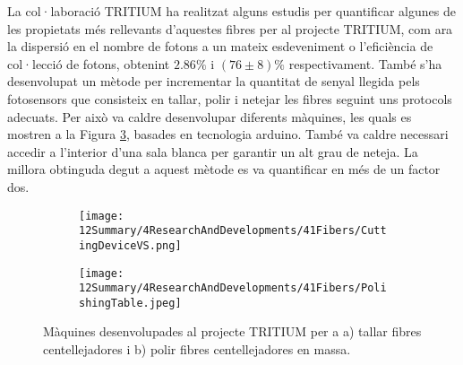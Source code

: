 La col·laboració TRITIUM ha realitzat alguns estudis per quantificar algunes de les propietats més rellevants d'aquestes fibres per al projecte TRITIUM, com ara la dispersió en el nombre de fotons a un mateix esdeveniment o l'eficiència de col·lecció de fotons, obtenint $2.86\%$ i $(76 \pm 8)\%$ respectivament. També s'ha desenvolupat un mètode per incrementar la quantitat de senyal llegida pels fotosensors que consisteix en tallar, polir i netejar les fibres seguint uns protocols adecuats. Per això va caldre desenvolupar diferents màquines, les quals es mostren a la Figura \ref{fig:MaquinesTRITIUM}, basades en tecnologia arduino. També va caldre necessari accedir a l'interior d'una sala blanca per garantir un alt grau de neteja. La millora obtinguda degut a aquest mètode es va quantificar en més de un factor dos. 

\begin{figure}
\centering
    \begin{subfigure}[b]{0.5\textwidth}
    \centering
    \texttt{[image: 12Summary/4ResearchAndDevelopments/41Fibers/CuttingDeviceVS.png]}  
    \caption{\label{subfig:MaquinaTallar}}
    \end{subfigure}
    \hfill
    \begin{subfigure}[b]{0.45\textwidth}
    \centering
    \texttt{[image: 12Summary/4ResearchAndDevelopments/41Fibers/PolishingTable.jpeg]}  
    \caption{\label{subfig:MaquinaPolir}}
    \end{subfigure}
 \caption{Màquines desenvolupades al projecte TRITIUM per a a) tallar fibres centellejadores i b) polir fibres centellejadores en massa. \label{fig:MaquinesTRITIUM}}
\end{figure}